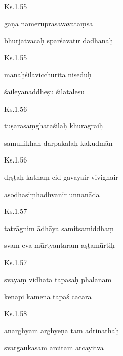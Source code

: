 \documentclass{tufte-handout}
\newenvironment{sanskrit}%
{\begin{otherlanguage}{sanskrit-devanagari}}%
{\end{otherlanguage}}
\begin{document}
    
	\begin{sanskrit}
	
	    
		Ks.1.55 
    
	    
		gaṇā nameruprasavāvataṃsā 
    
	    
		bhūrjatvacaḥ sparśavatīr dadhānāḥ 
    
	\end{sanskrit}

    
	\begin{sanskrit}
	
	    
		Ks.1.55 
    
	    
		manaḥśilāvicchuritā niṣeduḥ 
    
	    
		śaileyanaddheṣu śilātaleṣu 
    
	\end{sanskrit}

    
	\begin{sanskrit}
	
	    
		Ks.1.56 
    
	    
		tuṣārasaṃghātaśilāḥ khurāgraiḥ 
    
	    
		samullikhan darpakalaḥ kakudmān 
    
	\end{sanskrit}

    
	\begin{sanskrit}
	
	    
		Ks.1.56 
    
	    
		dṛṣṭaḥ kathaṃ cid gavayair vivignair 
    
	    
		asoḍhasiṃhadhvanir unnanāda 
    
	\end{sanskrit}

    
	\begin{sanskrit}
	
	    
		Ks.1.57 
    
	    
		tatrāgnim ādhāya samitsamiddhaṃ 
    
	    
		svam eva mūrtyantaram aṣṭamūrtiḥ 
    
	\end{sanskrit}

    
	\begin{sanskrit}
	
	    
		Ks.1.57 
    
	    
		svayaṃ vidhātā tapasaḥ phalānām 
    
	    
		kenāpi kāmena tapaś cacāra 
    
	\end{sanskrit}

    
	\begin{sanskrit}
	
	    
		Ks.1.58 
    
	    
		anarghyam arghyeṇa tam adrināthaḥ 
    
	    
		svargaukasām arcitam arcayitvā 
    
	\end{sanskrit}
\end{document}
